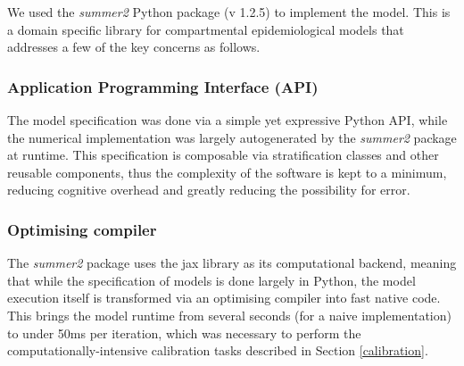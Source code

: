 
We used the \textit{summer2} Python package (v 1.2.5) to implement the model. This is a domain specific library for 
compartmental epidemiological models that addresses a few of the key concerns as follows.

\subsubsection{Application Programming Interface (API)}
The model specification was done via a simple yet expressive Python API, 
while the numerical implementation was largely autogenerated by the \textit{summer2} package at runtime. 
This specification is composable via stratification classes and other reusable components, 
thus the complexity of the software is kept to a minimum, reducing cognitive overhead and greatly reducing the possibility for error.

\subsubsection{Optimising compiler}
The \textit{summer2} package uses the jax library as its computational backend, meaning that while the specification of models is done largely in Python, 
the model execution itself is transformed via an optimising compiler into fast native code.
This brings the model runtime from several seconds (for a naive implementation) to under 50ms per iteration, which was necessary to perform the computationally-intensive
calibration tasks described in Section \ref{calibration}.




